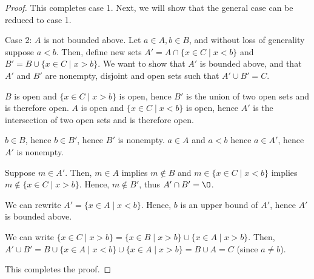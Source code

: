 \documentclass[11pt]{article}
\renewcommand{\emptyset}{\O}
\renewcommand{\_}[1]{\underline{ #1 }}
\theoremstyle{definition}
\numberwithin{equation}{subsection}
\begin{document}
\begin{enumerate}
\begin{proof}
This completes case 1. Next, we will show that the general case can be reduced to case 1.

Case 2: $A$ is not bounded above. Let $a \in A, b\in B$, and without loss of generality suppose $a <b$. Then, define new sets $A' = A \cap \{x \in C \mid x < b\}$ and $B' = B \cup \{x \in C \mid x > b\}$. We want to show that $A'$ is bounded above, and that $A'$ and $B'$ are nonempty, disjoint and open sets such that $A' \cup B' = C$. 

$B$ is open and $\{x \in C \mid x > b\}$ is open, hence $B'$ is the union of two open sets and is therefore open. $A$ is open and $\{x \in C \mid x < b\}$ is open, hence $A'$ is the intersection of two open sets and is therefore open. 

$b \in B$, hence $b \in B'$, hence $B'$ is nonempty. $a \in A$ and $a <b$ hence $a \in A'$, hence $A'$ is nonempty.

Suppose $m \in A'$. Then, $m \in A$ implies $m \notin B$ and $m \in \{x \in C \mid x < b\}$ implies $m \notin \{x \in C \mid x > b\}$. Hence, $m \notin B'$, thus $A' \cap B' = \emptyset$.

We can rewrite $A' = \{x \in A \mid x < b\}$. Hence, $b$ is an upper bound of $A'$, hence $A'$ is bounded above.

We can write $\{x \in C \mid x > b\} = \{x \in B \mid x > b\} \cup \{x \in A \mid x > b\}$. Then, $A' \cup B' = B \cup \{x \in A \mid x < b\} \cup \{x \in A \mid x > b\} = B \cup A = C$ (since $a \neq b$).

This completes the proof.

\renewcommand\qedsymbol{QED}
\end{proof}




\end{enumerate}
\end{document}

